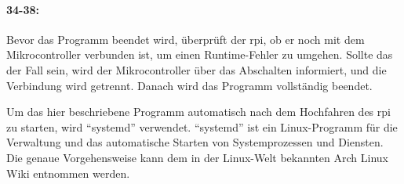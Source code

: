 \paragraph{34-38:}
Bevor das Programm beendet wird, überprüft der \ac{rpi}, ob er noch mit dem Mikrocontroller verbunden ist, um einen Runtime-Fehler zu umgehen.
Sollte das der Fall sein, wird der Mikrocontroller über das Abschalten informiert, und die Verbindung wird getrennt.
Danach wird das Programm vollständig beendet.

Um das hier beschriebene Programm automatisch nach dem Hochfahren des \ac{rpi} zu starten, wird \enquote{systemd} verwendet.
\enquote{systemd} ist ein Linux-Programm für die Verwaltung und das automatische Starten von Systemprozessen und Diensten.
Die genaue Vorgehensweise kann dem in der Linux-Welt bekannten Arch Linux Wiki entnommen werden. \cite[vgl.][Writing unit files]{arch-systemd}